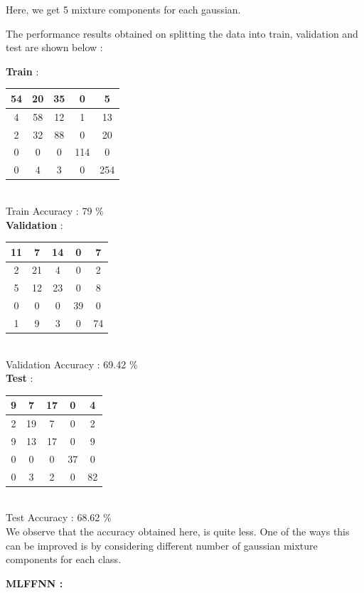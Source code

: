 \documentclass{article}
\begin{document}
\begin{flushleft}

Here, we get 5 mixture components for each gaussian. 

The performance results obtained on splitting the data into train, validation and test are shown below :

\textbf{Train} : \\[10pt]


\begin{tabular}{|c|c|c|c|c|} \hline 54 & 20 & 35 & 0 & 5\\ \hline 4 & 58 & 12 & 1 & 13\\ \hline 2 & 32 & 88 & 0 & 20\\ \hline 0 & 0 & 0 & 114 & 0\\ \hline 0 & 4 & 3 & 0 & 254 \\ \hline \end{tabular}\\[10pt]

Train Accuracy : 79 \% \\[10pt]

\textbf{Validation} :  \\[10pt]
\begin{tabular}{|c|c|c|c|c|} \hline 11 & 7 & 14 & 0 & 7\\ \hline 2 & 21 & 4 & 0 & 2\\ \hline 5 & 12 & 23 & 0 & 8\\ \hline 0 & 0 & 0 & 39 & 0\\ \hline 1 & 9 & 3 & 0 & 74 \\ \hline \end{tabular}\\[10pt]

Validation Accuracy : 69.42  \% \\[10pt]
\textbf{Test} :  \\[10pt]
\begin{tabular}{|c|c|c|c|c|}  \hline 9 & 7 & 17 & 0 & 4\\ \hline 2 & 19 & 7 & 0 & 2\\ \hline 9 & 13 & 17 & 0 & 9\\ \hline 0 & 0 & 0 & 37 & 0\\ \hline 0 & 3 & 2 & 0 & 82 \\ \hline \end{tabular}\\[10pt]

Test Accuracy : 68.62 \% \\[10pt]


We observe that the accuracy obtained here, is quite less. One of the ways this can be improved is by considering different number of gaussian mixture components for each class.


\textbf{MLFFNN :}

\end{flushleft}
\end{document}
